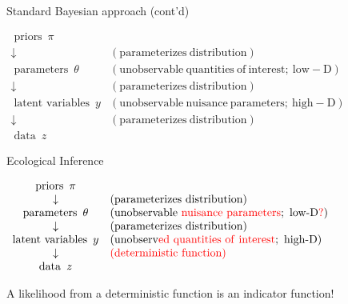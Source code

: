\documentclass[
  ignorenonframetext,
]{beamer}
\begin{document}
\begin{frame}{Standard Bayesian approach (cont'd)}
\protect\hypertarget{standard-bayesian-approach-contd}{}

\(\begin{array}{cl} \operatorname{priors}~\pi & \\ \downarrow & \operatorname{(parameterizes~distribution)}\\ \operatorname{parameters}~\theta & \operatorname{(unobservable~quantities~of~interest;~low-D)}\\ \downarrow & \operatorname{(parameterizes~distribution)}\\ \operatorname{latent~variables}~y & \operatorname{(unobservable~nuisance~parameters;~high-D)}\\ \downarrow & \operatorname{(parameterizes~distribution)}\\ \operatorname{data}~z & \end{array}\)

\end{frame}

\begin{frame}{Ecological Inference}
\protect\hypertarget{ecological-inference}{}

\(\begin{array}{cl} \operatorname{priors}~\pi & \\ \downarrow & \operatorname{(parameterizes~distribution)}\\ \operatorname{parameters}~\theta & \operatorname{(unobservable~\textcolor{red}{nuisance~parameters};~low-D\textcolor{red}{?})}\\ \downarrow & \operatorname{(parameterizes~distribution)}\\ \operatorname{latent~variables}~y & \operatorname{(unobserv\textcolor{red}{ed~quantities~of~interest};~high-D)}\\ \downarrow & \operatorname{\textcolor{red}{(deterministic~function)}}\\ \operatorname{data}~z & \end{array}\)

A likelihood from a deterministic function is an indicator function!

\end{frame}
\end{document}
